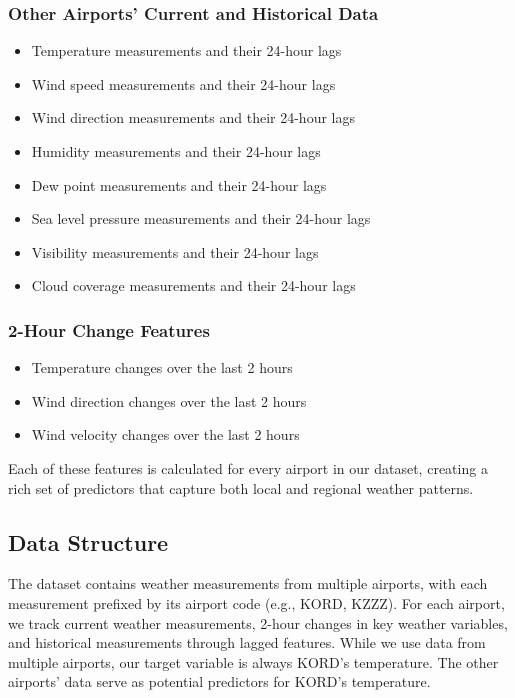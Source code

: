 \subsubsection{Other Airports' Current and Historical Data}
\begin{itemize}
  \item Temperature measurements and their 24-hour lags
  \item Wind speed measurements and their 24-hour lags
  \item Wind direction measurements and their 24-hour lags
  \item Humidity measurements and their 24-hour lags
  \item Dew point measurements and their 24-hour lags
  \item Sea level pressure measurements and their 24-hour lags
  \item Visibility measurements and their 24-hour lags
  \item Cloud coverage measurements and their 24-hour lags
\end{itemize}

\subsubsection{2-Hour Change Features}
\begin{itemize}
  \item Temperature changes over the last 2 hours
  \item Wind direction changes over the last 2 hours
  \item Wind velocity changes over the last 2 hours
\end{itemize}

Each of these features is calculated for every airport in our dataset, creating a rich set of predictors that capture both local and regional weather patterns.

\subsection{Data Structure}
The dataset contains weather measurements from multiple airports, with each measurement prefixed by its airport code (e.g., KORD, KZZZ). For each airport, we track current weather measurements, 2-hour changes in key weather variables, and historical measurements through lagged features. While we use data from multiple airports, our target variable is always KORD's temperature. The other airports' data serve as potential predictors for KORD's temperature.

